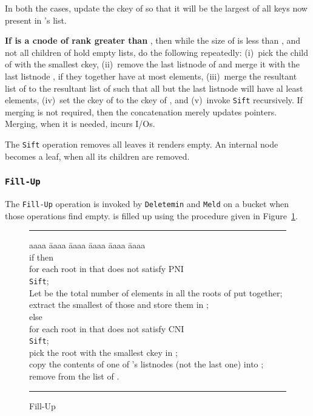 In both the cases, update the ckey of  so that it will be the largest of all keys now present in 's list.
	
{\bf If  is a cnode of rank greater than }, then
	while the size of  is less than , and not all children of  hold
	empty lists, do the following repeatedly: 
        (i)~pick the child  of  with the smallest ckey, (ii)~remove the last listnode 
	of  and merge it with the last listnode , if they together have at most
	 elements, (iii)~merge the resultant list of  to the resultant list of  such that all but the last listnode will have al least  elements,
	(iv)~set the ckey of  to the ckey of , and (v)~invoke {\tt Sift} recursively.
If merging is not required, then the concatenation merely updates  pointers.
Merging, when it is needed, incurs  I/Os.

The {\tt Sift} operation removes all leaves it renders empty.
An internal node becomes a leaf, when all its children are removed.

\subsubsection{{\tt Fill-Up}}
The {\tt Fill-Up} operation is invoked by {\tt Deletemin} and {\tt Meld} 
	on a bucket  when those operations find  empty.
 is filled up using the procedure given in Figure~\ref{fig:fillup}.

\begin{figure}
\vspace{0.2in}
\hrule
\begin{tabbing}
aaaa \= aaaa \= aaaa \= aaaa \= aaaa \= aaaa \kill \\
if  then \\
	\> for each root  in  that does not satisfy PNI \\
	\> 	\> {\tt Sift}; \\
	\> Let  be the total number of elements in all the roots of  put together; \\
	\> extract the smallest  of those and store them in ; \\
else \\
	\> for each root  in  that does not satisfy CNI \\
	\>	\> {\tt Sift}; \\
	\> pick the root  with the smallest ckey in ; \\
        \> copy the contents of one  of 's listnodes (not the last one) into ; \\
        \> remove  from the list of .
\end{tabbing}
\vspace{0.1in}
\hrule
\vspace{0.2in}
\caption{Fill-Up}
\label{fig:fillup}
\end{figure}

